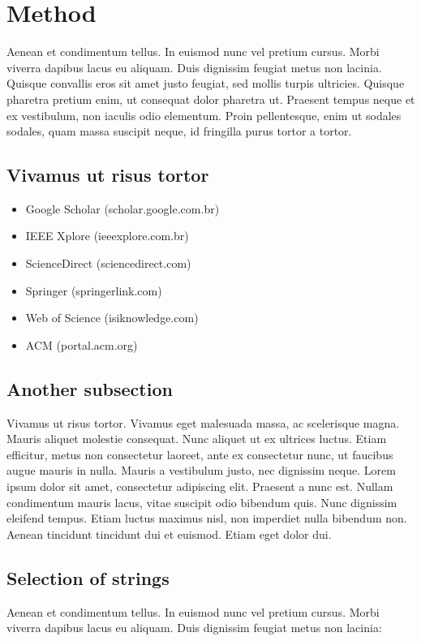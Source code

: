 \documentclass[12pt]{article}
\begin{document}
\section{Method} \label{sec:método}

    Aenean et condimentum tellus. In euismod nunc vel pretium cursus. Morbi viverra dapibus lacus eu aliquam. Duis dignissim feugiat metus non lacinia. Quisque convallis eros sit amet justo feugiat, sed mollis turpis ultricies. Quisque pharetra pretium enim, ut consequat dolor pharetra ut. Praesent tempus neque et ex vestibulum, non iaculis odio elementum. Proin pellentesque, enim ut sodales sodales, quam massa suscipit neque, id fringilla purus tortor a tortor.


\subsection{Vivamus ut risus tortor}  
    \begin{itemize}
        \item Google Scholar (scholar.google.com.br) 
        \item IEEE Xplore (ieeexplore.com.br) 
        \item ScienceDirect (sciencedirect.com) 
        \item Springer (springerlink.com) 
        \item Web of Science (isiknowledge.com) 
        \item ACM (portal.acm.org) 
    \end{itemize}

\subsection{Another subsection}

    Vivamus ut risus tortor. Vivamus eget malesuada massa, ac scelerisque magna. Mauris aliquet molestie consequat. Nunc aliquet ut ex ultrices luctus. Etiam efficitur, metus non consectetur laoreet, ante ex consectetur nunc, ut faucibus augue mauris in nulla. Mauris a vestibulum justo, nec dignissim neque. Lorem ipsum dolor sit amet, consectetur adipiscing elit. Praesent a nunc est. Nullam condimentum mauris lacus, vitae suscipit odio bibendum quis. Nunc dignissim eleifend tempus. Etiam luctus maximus nisl, non imperdiet nulla bibendum non. Aenean tincidunt tincidunt dui et euismod. Etiam eget dolor dui.

\subsection{Selection of strings}
    Aenean et condimentum tellus. In euismod nunc vel pretium cursus. Morbi viverra dapibus lacus eu aliquam. Duis dignissim feugiat metus non lacinia:
    
\end{document}
